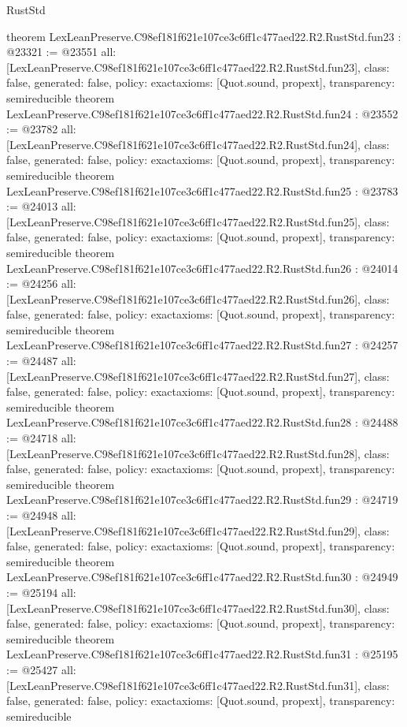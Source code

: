 \begin{lexlean}{RustStd}
\begin{coremodule}
{}
theorem LexLeanPreserve.C98ef181f621e107ce3c6ff1c477aed22.R2.RustStd.fun23 : @23321 := @23551 {
  all: [LexLeanPreserve.C98ef181f621e107ce3c6ff1c477aed22.R2.RustStd.fun23],
  class: false,
  generated: false,
  policy: exact{axioms: [Quot.sound, propext]},
  transparency: semireducible
}
theorem LexLeanPreserve.C98ef181f621e107ce3c6ff1c477aed22.R2.RustStd.fun24 : @23552 := @23782 {
  all: [LexLeanPreserve.C98ef181f621e107ce3c6ff1c477aed22.R2.RustStd.fun24],
  class: false,
  generated: false,
  policy: exact{axioms: [Quot.sound, propext]},
  transparency: semireducible
}
theorem LexLeanPreserve.C98ef181f621e107ce3c6ff1c477aed22.R2.RustStd.fun25 : @23783 := @24013 {
  all: [LexLeanPreserve.C98ef181f621e107ce3c6ff1c477aed22.R2.RustStd.fun25],
  class: false,
  generated: false,
  policy: exact{axioms: [Quot.sound, propext]},
  transparency: semireducible
}
theorem LexLeanPreserve.C98ef181f621e107ce3c6ff1c477aed22.R2.RustStd.fun26 : @24014 := @24256 {
  all: [LexLeanPreserve.C98ef181f621e107ce3c6ff1c477aed22.R2.RustStd.fun26],
  class: false,
  generated: false,
  policy: exact{axioms: [Quot.sound, propext]},
  transparency: semireducible
}
theorem LexLeanPreserve.C98ef181f621e107ce3c6ff1c477aed22.R2.RustStd.fun27 : @24257 := @24487 {
  all: [LexLeanPreserve.C98ef181f621e107ce3c6ff1c477aed22.R2.RustStd.fun27],
  class: false,
  generated: false,
  policy: exact{axioms: [Quot.sound, propext]},
  transparency: semireducible
}
theorem LexLeanPreserve.C98ef181f621e107ce3c6ff1c477aed22.R2.RustStd.fun28 : @24488 := @24718 {
  all: [LexLeanPreserve.C98ef181f621e107ce3c6ff1c477aed22.R2.RustStd.fun28],
  class: false,
  generated: false,
  policy: exact{axioms: [Quot.sound, propext]},
  transparency: semireducible
}
theorem LexLeanPreserve.C98ef181f621e107ce3c6ff1c477aed22.R2.RustStd.fun29 : @24719 := @24948 {
  all: [LexLeanPreserve.C98ef181f621e107ce3c6ff1c477aed22.R2.RustStd.fun29],
  class: false,
  generated: false,
  policy: exact{axioms: [Quot.sound, propext]},
  transparency: semireducible
}
theorem LexLeanPreserve.C98ef181f621e107ce3c6ff1c477aed22.R2.RustStd.fun30 : @24949 := @25194 {
  all: [LexLeanPreserve.C98ef181f621e107ce3c6ff1c477aed22.R2.RustStd.fun30],
  class: false,
  generated: false,
  policy: exact{axioms: [Quot.sound, propext]},
  transparency: semireducible
}
theorem LexLeanPreserve.C98ef181f621e107ce3c6ff1c477aed22.R2.RustStd.fun31 : @25195 := @25427 {
  all: [LexLeanPreserve.C98ef181f621e107ce3c6ff1c477aed22.R2.RustStd.fun31],
  class: false,
  generated: false,
  policy: exact{axioms: [Quot.sound, propext]},
  transparency: semireducible
}
\end{coremodule}
\end{lexlean}
